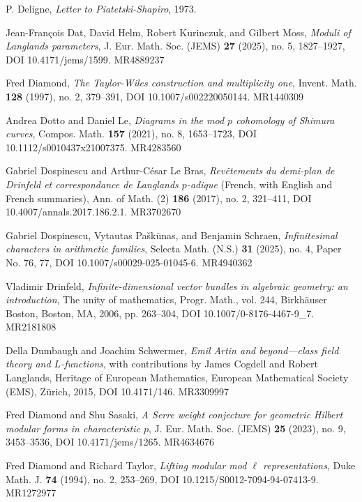 \item[{[Del73]}] P. Deligne, \emph{Letter to Piatetski-Shapiro}, 1973.
\item[{[DHKM25]}] Jean-Fran\c{c}ois Dat, David Helm, Robert Kurinczuk, and Gilbert Moss, \emph{Moduli of Langlands parameters}, J. Eur. Math. Soc. (JEMS) \textbf{27} (2025), no. 5, 1827--1927, DOI 10.4171/jems/1599. MR4889237
\item[{[Dia97]}] Fred Diamond, \emph{The Taylor-Wiles construction and multiplicity one}, Invent. Math. \textbf{128} (1997), no. 2, 379--391, DOI 10.1007/s002220050144. MR1440309
\item[{[DL21]}] Andrea Dotto and Daniel Le, \emph{Diagrams in the mod $p$ cohomology of Shimura curves}, Compos. Math. \textbf{157} (2021), no. 8, 1653--1723, DOI 10.1112/s0010437x21007375. MR4283560
\item[{[DLB17]}] Gabriel Dospinescu and Arthur-C\'esar Le Bras, \emph{Rev\^etements du demi-plan de Drinfeld et correspondance de Langlands $p$-adique} (French, with English and French summaries), Ann. of Math. (2) \textbf{186} (2017), no. 2, 321--411, DOI 10.4007/annals.2017.186.2.1. MR3702670
\item[{[DPS25]}] Gabriel Dospinescu, Vytautas Pa\v{s}k\={u}nas, and Benjamin Schraen, \emph{Infinitesimal characters in arithmetic families}, Selecta Math. (N.S.) \textbf{31} (2025), no. 4, Paper No. 76, 77, DOI 10.1007/s00029-025-01045-6. MR4940362
\item[{[Dri06]}] Vladimir Drinfeld, \emph{Infinite-dimensional vector bundles in algebraic geometry: an introduction}, The unity of mathematics, Progr. Math., vol. 244, Birkh\"auser Boston, Boston, MA, 2006, pp. 263--304, DOI 10.1007/0-8176-4467-9\_7. MR2181808
\item[{[DS15]}] Della Dumbaugh and Joachim Schwermer, \emph{Emil Artin and beyond---class field theory and $L$-functions}, with contributions by James Cogdell and Robert Langlands, Heritage of European Mathematics, European Mathematical Society (EMS), Z\"urich, 2015, DOI 10.4171/146. MR3309997
\item[{[DS23]}] Fred Diamond and Shu Sasaki, \emph{A Serre weight conjecture for geometric Hilbert modular forms in characteristic $p$}, J. Eur. Math. Soc. (JEMS) \textbf{25} (2023), no. 9, 3453--3536, DOI 10.4171/jems/1265. MR4634676
\item[{[DT94]}] Fred Diamond and Richard Taylor, \emph{Lifting modular mod $\ell$ representations}, Duke Math. J. \textbf{74} (1994), no. 2, 253--269, DOI 10.1215/S0012-7094-94-07413-9. MR1272977

